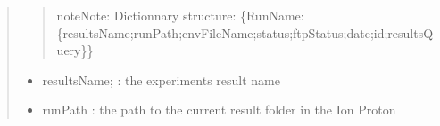 \documentclass[letterpaper,10pt,english]{sphinxmanual}
\begin{document}
\begin{fulllineitems}
\begin{quote}
\begin{description}
\begin{quote}
\begin{notice}{note}{Note:}
Dictionnary structure: \{RunName: \{resultsName;runPath;cnvFileName;status;ftpStatus;date;id;resultsQuery\}\}
\end{notice}
\end{quote}
\begin{itemize}
\item {} 
resultsName; : the experiments result name

\item {} 
runPath : the path to the current result folder in the Ion Proton

\end{itemize}


\end{description}\end{quote}

\end{fulllineitems}

\end{document}
